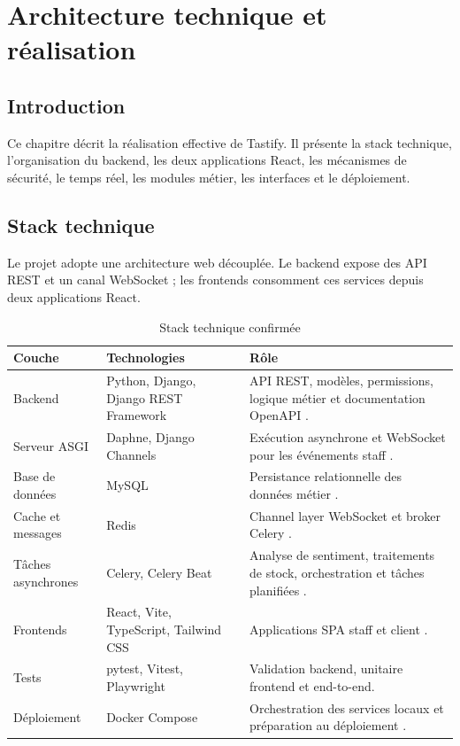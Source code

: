 \chapter{Architecture technique et réalisation}
\label{chap:realisation}

\section*{Introduction}
Ce chapitre décrit la réalisation effective de Tastify. Il présente la stack technique, l'organisation du backend, les deux applications React, les mécanismes de sécurité, le temps réel, les modules métier, les interfaces et le déploiement.

\section{Stack technique}
Le projet adopte une architecture web découplée. Le backend expose des API REST et un canal WebSocket ; les frontends consomment ces services depuis deux applications React.

\begin{table}[H]
\centering
\caption{Stack technique confirmée}
\label{tab:stack}
\begin{tabularx}{\textwidth}{p{3.3cm}p{3.8cm}Y}
\toprule
\textbf{Couche} & \textbf{Technologies} & \textbf{Rôle} \\
\midrule
Backend & Python, Django, Django REST Framework & API REST, modèles, permissions, logique métier et documentation OpenAPI \cite{django,drf}. \\
Serveur ASGI & Daphne, Django Channels & Exécution asynchrone et WebSocket pour les événements staff \cite{channels}. \\
Base de données & MySQL & Persistance relationnelle des données métier \cite{mysql}. \\
Cache et messages & Redis & Channel layer WebSocket et broker Celery \cite{redis}. \\
Tâches asynchrones & Celery, Celery Beat & Analyse de sentiment, traitements de stock, orchestration et tâches planifiées \cite{celery}. \\
Frontends & React, Vite, TypeScript, Tailwind CSS & Applications SPA staff et client \cite{react,vite,tailwind}. \\
Tests & pytest, Vitest, Playwright & Validation backend, unitaire frontend et end-to-end. \\
Déploiement & Docker Compose & Orchestration des services locaux et préparation au déploiement \cite{docker}. \\
\bottomrule
\end{tabularx}
\end{table}

